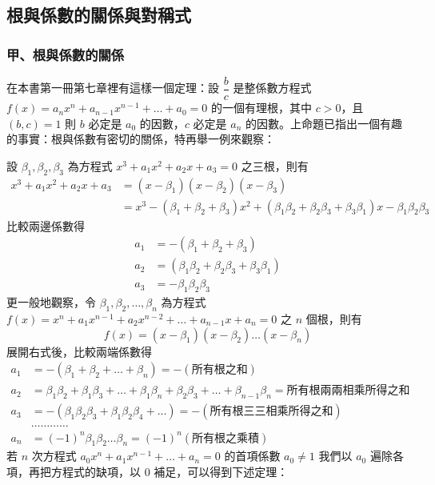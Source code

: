 \subsection{根與係數的關係與對稱式}\label{sec:b6-2-3}
\resetsectcounters

\subsubsection*{甲、根與係數的關係}\label{subsec:b6-2-3-a}

在本書第一冊第七章裡有這樣一個定理：設 $\dfrac{b}{c}$ 是整係數方程式 $f(x) = a_n x^n + a_{n-1} x^{n-1} + \dots + a_0 = 0$ 的一個有理根，其中 $c > 0$，且 $(b, c)=1$ 則 $b$ 必定是 $a_0$ 的因數，$c$ 必定是 $a_n$ 的因數。上命題已指出一個有趣的事實：根與係數有密切的關係，特再舉一例來觀察：

設 $\beta_1, \beta_2, \beta_3$ 為方程式 $x^3 + a_1 x^2 + a_2 x + a_3 = 0$ 之三根，則有
\begin{align*}
x^3 + a_1 x^2 + a_2 x + a_3 &= (x-\beta_1)(x-\beta_2)(x-\beta_3) \\
&= x^3 - (\beta_1+\beta_2+\beta_3)x^2 + (\beta_1\beta_2+\beta_2\beta_3+\beta_3\beta_1)x - \beta_1\beta_2\beta_3
\end{align*}
比較兩邊係數得
\begin{align*}
a_1 &= -(\beta_1+\beta_2+\beta_3) \\
a_2 &= (\beta_1\beta_2+\beta_2\beta_3+\beta_3\beta_1) \\
a_3 &= -\beta_1\beta_2\beta_3
\end{align*}
更一般地觀察，令 $\beta_1, \beta_2, \dots, \beta_n$ 為方程式 $f(x) = x^n + a_1 x^{n-1} + a_2 x^{n-2} + \dots + a_{n-1} x + a_n = 0$ 之 $n$ 個根，則有
\[ f(x) = (x-\beta_1)(x-\beta_2)\dots(x-\beta_n) \]
展開右式後，比較兩端係數得
\begin{equation}
\begin{aligned}
a_1 &= -(\beta_1+\beta_2+\dots+\beta_n) = -(\text{所有根之和}) \\
a_2 &= \beta_1\beta_2+\beta_1\beta_3+\dots+\beta_1\beta_n+\beta_2\beta_3+\dots+\beta_{n-1}\beta_n = \text{所有根兩兩相乘所得之和} \\
a_3 &= -(\beta_1\beta_2\beta_3+\beta_1\beta_2\beta_4+\dots) = -(\text{所有根三三相乘所得之和}) \\
&\dots\dots\dots\dots \\
a_n &= (-1)^n \beta_1\beta_2\dots\beta_n = (-1)^n (\text{所有根之乘積})
\end{aligned} \tag{I} \label{eq:b6-2-3-I}
\end{equation}
若 $n$ 次方程式 $a_0 x^n + a_1 x^{n-1} + \dots + a_n = 0$ 的首項係數 $a_0 \ne 1$ 我們以 $a_0$ 遍除各項，再把方程式的缺項，以 0 補足，可以得到下述定理：

